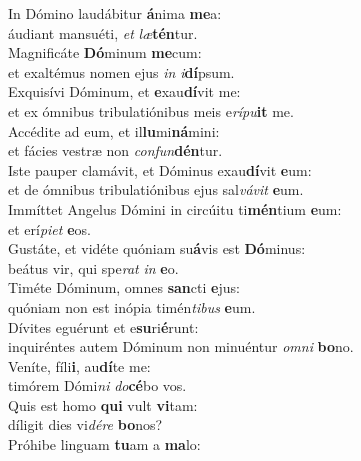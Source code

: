 \evenverse In Dómino laudábitur \textbf{á}nima \textbf{me}a:~\*\\
\evenverse áudiant mansuéti, \textit{et} \textit{læ}\textbf{tén}tur.\\
\oddverse Magnificáte \textbf{Dó}minum \textbf{me}cum:~\*\\
\oddverse et exaltémus nomen ejus \textit{in} \textit{i}\textbf{dí}psum.\\
\evenverse Exquisívi Dóminum, et \textbf{e}xau\textbf{dí}vit me:~\*\\
\evenverse et ex ómnibus tribulatiónibus meis e\textit{rí}\textit{pu}\textbf{it} me.\\
\oddverse Accédite ad eum, et il\textbf{lu}mi\textbf{ná}mini:~\*\\
\oddverse et fácies vestræ non \textit{con}\textit{fun}\textbf{dén}tur.\\
\evenverse Iste pauper clamávit, et Dóminus exau\textbf{dí}vit \textbf{e}um:~\*\\
\evenverse et de ómnibus tribulatiónibus ejus sal\textit{vá}\textit{vit} \textbf{e}um.\\
\oddverse Immíttet Angelus Dómini in circúitu ti\textbf{mén}tium \textbf{e}um:~\*\\
\oddverse et erí\textit{pi}\textit{et} \textbf{e}os.\\
\evenverse Gustáte, et vidéte quóniam su\textbf{á}vis est \textbf{Dó}minus:~\*\\
\evenverse beátus vir, qui spe\textit{rat} \textit{in} \textbf{e}o.\\
\oddverse Timéte Dóminum, omnes \textbf{san}cti \textbf{e}jus:~\*\\
\oddverse quóniam non est inópia timén\textit{ti}\textit{bus} \textbf{e}um.\\
\evenverse Dívites eguérunt et e\textbf{su}ri\textbf{é}runt:~\*\\
\evenverse inquiréntes autem Dóminum non minuéntur \textit{om}\textit{ni} \textbf{bo}no.\\
\oddverse Veníte, fíli\textbf{i}, au\textbf{dí}te me:~\*\\
\oddverse timórem Dómi\textit{ni} \textit{do}\textbf{cé}bo vos.\\
\evenverse Quis est homo \textbf{qui} vult \textbf{vi}tam:~\*\\
\evenverse díligit dies vi\textit{dé}\textit{re} \textbf{bo}nos?\\
\oddverse Próhibe linguam \textbf{tu}am a \textbf{ma}lo:~\*\\
